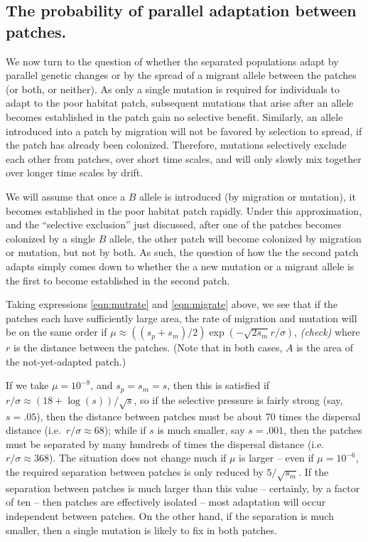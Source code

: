 \documentclass{article}
\newcommand{\plr}[1]{{\it\color{blue}(#1)}}
\begin{document}
\subsection{The probability of parallel adaptation between patches.} 
\label{ss:probparallel}

We now turn to the question of whether the separated populations adapt by parallel genetic changes 
or by the spread of a migrant allele between the patches
(or both, or neither).
As only a single mutation is required for individuals to adapt to the
poor habitat patch, subsequent mutations that arise after an allele becomes established in the patch gain no selective benefit. 
Similarly, an allele introduced into a patch by migration will not be favored by selection to spread, 
if the patch has already been colonized. 
Therefore, mutations selectively exclude each other from patches, over short time scales, 
and will only slowly mix together over longer time scales by drift. 

We will assume that once a $B$ allele is introduced (by migration or mutation), 
it becomes established in the poor habitat patch rapidly. 
Under this approximation, and the ``selective exclusion'' just discussed,
after one of the patches becomes colonized by a single $B$ allele, 
the other patch will become colonized by migration or mutation, but not by both. 
As such, the question of how the the second patch adapts
simply comes down to whether the a new mutation or a migrant allele is the first to become established in the second patch. 

Taking expressions \eqref{eqn:mutrate} and \eqref{eqn:migrate} above,
we see that if the patches each have sufficiently large area,
the rate of migration and mutation will be on the same order if 
$\mu \approx ((s_p+s_m)/2) \exp(-\sqrt{2 s_m} r / \sigma)$,
\plr{check}
where $r$ is the distance between the patches.
(Note that in both cases, $A$ is the area of the not-yet-adapted patch.)

If we take $\mu = 10^{-8}$, and $s_p=s_m=s$, then this is satisfied if $r/\sigma \approx (18+\log(s))/\sqrt{s}$,
so if the selective pressure is fairly strong (say, $s=.05$),
then the distance between patches must be about 70 times the dispersal distance (i.e.\ $r/\sigma \approx 68$);
while if $s$ is much smaller, say $s = .001$, 
then the patches must be separated by many hundreds of times the dispersal distance (i.e.\ $r/\sigma \approx 368$).
The situation does not change much if $\mu$ is larger -- even if $\mu = 10^{-6}$, 
the required separation between patches is only reduced by $5/\sqrt{s_m}$.
If the separation between patches is much larger than this value -- certainly, by a factor of ten -- 
then patches are effectively isolated -- most adaptation will occur independent between patches.
On the other hand, if the separation is much smaller, then a single
mutation is likely to fix in both patches.
\end{document}
